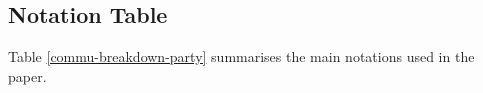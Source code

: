 

\subsection{Notation Table}\label{sec::notation-table}
Table \ref{commu-breakdown-party} summarises the main notations used in the paper. 



\begin{table}[!h]
\begin{scriptsize}
\begin{center}
\footnotesize{
\vspace{-6mm}
\caption{ \small{Notation Table}.}\label{commu-breakdown-party} 
\renewcommand{\arraystretch}{.88}
}
\end{center}
\end{scriptsize}
\end{table}
